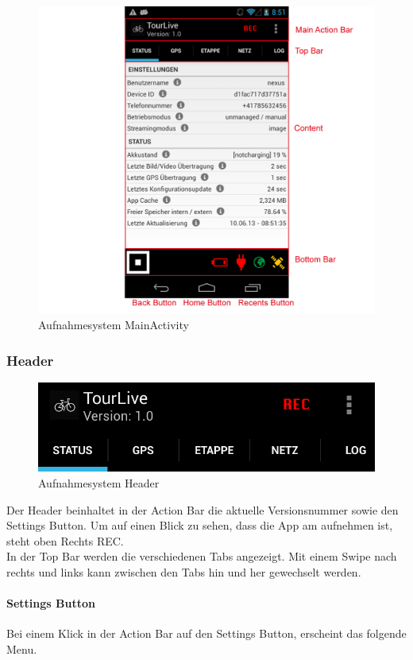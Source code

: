 \begin{figure}[H]
	\centering
	\includegraphics[width=150mm]{images/android/status.png}
	\caption{Aufnahmesystem MainActivity}
\end{figure}


\subsubsection{Header}
\begin{figure}[H]
	\centering
	\includegraphics[width=150mm]{images/android/header.png}
	\caption{Aufnahmesystem Header}
\end{figure}
Der Header beinhaltet in der Action Bar die aktuelle Versionsnummer sowie den Settings Button. Um auf einen Blick zu sehen, dass die App am aufnehmen ist, steht oben Rechts REC. \\
In der Top Bar werden die verschiedenen Tabs angezeigt. Mit einem Swipe nach rechts und links kann zwischen den Tabs hin und her gewechselt werden.

\paragraph{Settings Button}
Bei einem Klick in der Action Bar auf den Settings Button, erscheint das folgende Menu.

